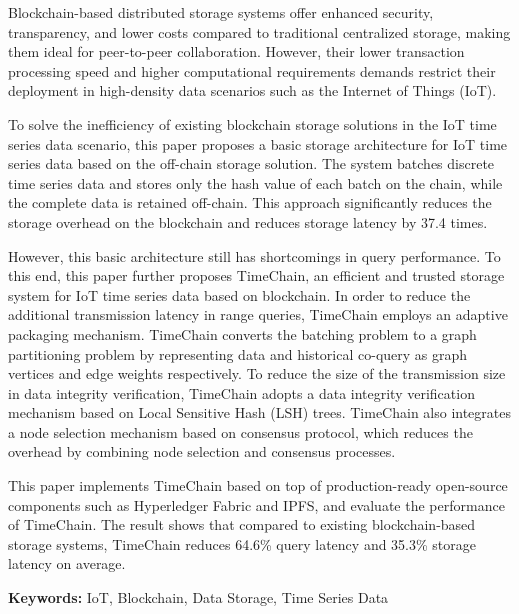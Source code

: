 \cleardoublepage
{}

Blockchain-based distributed storage systems offer enhanced security, transparency, and lower costs compared to traditional centralized storage, making them ideal for peer-to-peer collaboration. 
However, their lower transaction processing speed and higher computational requirements demands restrict their deployment in high-density data scenarios such as the Internet of Things (IoT).

To solve the inefficiency of existing blockchain storage solutions in the IoT time series data scenario, this paper proposes a basic storage architecture for IoT time series data based on the off-chain storage solution.
The system batches discrete time series data and stores only the hash value of each batch on the chain, while the complete data is retained off-chain.
This approach significantly reduces the storage overhead on the blockchain and reduces storage latency by 37.4 times.

However, this basic architecture still has shortcomings in query performance.
To this end, this paper further proposes TimeChain, an efficient and trusted storage system for IoT time series data based on blockchain.
In order to reduce the additional transmission latency in range queries, TimeChain employs an adaptive packaging mechanism. 
TimeChain converts the batching problem to a graph partitioning problem by representing data and historical co-query as graph vertices and edge weights respectively.
To reduce the size of the transmission size in data integrity verification, TimeChain adopts a data integrity verification mechanism based on Local Sensitive Hash (LSH) trees.
TimeChain also integrates a node selection mechanism based on consensus protocol, which reduces the overhead by combining node selection and consensus processes.

This paper implements TimeChain based on top of production-ready open-source components such as Hyperledger Fabric and IPFS, and evaluate the performance of TimeChain. 
The result shows that compared to existing blockchain-based storage systems, TimeChain reduces 64.6\% query latency and 35.3\% storage latency on average.

\textbf{Keywords:} IoT, Blockchain, Data Storage, Time Series Data